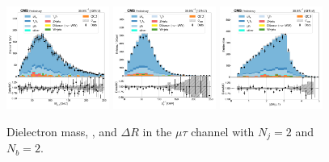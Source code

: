\begin{figure}[htb!]
    \centering
    \includegraphics[width=0.3\textwidth]{chapters/Analysis/sectionPlots/figures/data_mc_overlays/mutau_2016_cat_eq2_eq2_signal_linear_lepton_dilepton1_mass}
    \includegraphics[width=0.3\textwidth]{chapters/Analysis/sectionPlots/figures/data_mc_overlays/mutau_2016_cat_eq2_eq2_signal_linear_lepton_dilepton1_pt}
    \includegraphics[width=0.3\textwidth]{chapters/Analysis/sectionPlots/figures/data_mc_overlays/mutau_2016_cat_eq2_eq2_signal_linear_lepton_dilepton1_delta_r}
    \caption{Dielectron mass, \pt, and $\Delta R$ in the $\mu\tau$ channel
    with $N_{j} = 2$ and $N_{b} = 2$.}
    \label{fig:analysis:plots:mutau_6_dilepton}
\end{figure}

